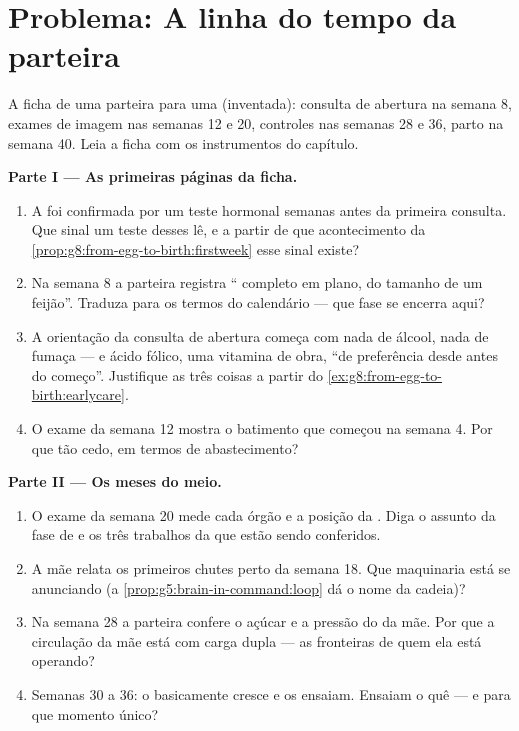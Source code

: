 \section{Problema: A linha do tempo da parteira}

\begin{problem}\label{pb:g8:from-egg-to-birth:1}
A ficha de uma parteira para uma  (inventada): consulta de
abertura na semana 8, exames de imagem nas semanas 12 e 20, controles
nas semanas 28 e 36, parto na semana 40. Leia a ficha com os
instrumentos do capítulo.

\medskip\noindent\textbf{Parte I --- As primeiras páginas
da ficha.}
\begin{enumerate}
  \item A  foi confirmada por um teste hormonal semanas antes
        da primeira consulta. Que sinal um teste desses lê, e a
        partir de que acontecimento da
        \cref{prop:g8:from-egg-to-birth:firstweek} esse sinal existe?
  \item Na semana 8 a parteira registra `` completo em plano,
        do tamanho de um feijão''. Traduza para os termos do
        calendário --- que fase se encerra aqui?
  \item A orientação da consulta de abertura começa com nada de
        álcool, nada de fumaça --- e ácido fólico, uma vitamina de
        obra, ``de preferência desde antes do começo''. Justifique as
        três coisas a partir do
        \cref{ex:g8:from-egg-to-birth:earlycare}.
  \item O exame da semana 12 mostra o batimento que começou na semana
        4. Por que tão cedo, em termos de abastecimento?
\end{enumerate}

\medskip\noindent\textbf{Parte II --- Os meses do meio.}
\begin{enumerate}[resume]
  \item O exame da semana 20 mede cada órgão e a posição da .
        Diga o assunto da fase de  e os três trabalhos da 
        que estão sendo conferidos.
  \item A mãe relata os primeiros chutes perto da semana 18. Que
        maquinaria está se anunciando (a
        \cref{prop:g5:brain-in-command:loop} dá o nome da cadeia)?
  \item Na semana 28 a parteira confere o açúcar e a pressão do
         da mãe. Por que a circulação da mãe está com carga
        dupla --- as fronteiras de quem ela está operando?
  \item Semanas 30 a 36: o  basicamente cresce e os 
        ensaiam. Ensaiam o quê --- e para que momento único?
\end{enumerate}


\end{problem}
